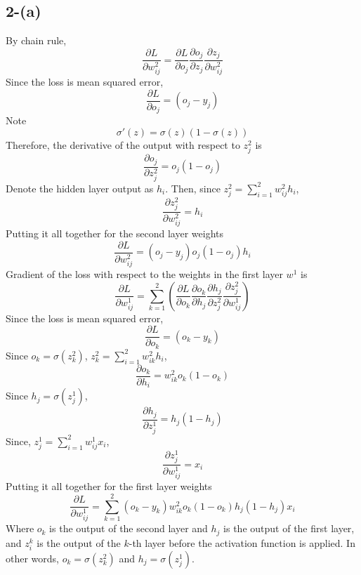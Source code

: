 \documentclass{article}
\begin{document}
\subsection*{2-(a)}
By chain rule,
\[
\frac{\partial L}{\partial w^2_{ij}} = \frac{\partial L}{\partial o_j} \frac{\partial o_j}{\partial z_j} \frac{\partial z_j}{\partial w^2_{ij}}
\]
Since the loss is mean squared error,
\[
\frac{\partial L}{\partial o_j} = (o_j - y_j)
\]
Note
\[
\sigma'(z) = \sigma(z)(1 - \sigma(z))
\]
Therefore, the derivative of the output with respect to $z^2_j$ is
\[
\frac{\partial o_j}{\partial z^2_j} = o_j(1 - o_j)
\]
Denote the hidden layer output as $h_i$. Then, since $z^2_j = \sum_{i=1}^{2} w^2_{ij} h_i$,
\[
\frac{\partial z^2_j}{\partial w^2_{ij}} = h_i
\]
Putting it all together for the second layer weights
\[
\frac{\partial L}{\partial w^2_{ij}} = (o_j - y_j) o_j(1 - o_j) h_i
\]
Gradient of the loss with respect to the weights in the first layer $w^1$ is
\[
\frac{\partial L}{\partial w^1_{ij}} = 
\sum_{k=1}^{2} \left( \frac{\partial L}{\partial o_k} \frac{\partial o_k}{\partial h_j} \frac{\partial h_j}{\partial z^2_j} \frac{\partial z^2_j}{\partial w^1_{ij}} \right)
\]
Since the loss is mean squared error,
\[
\frac{\partial L}{\partial o_k} = (o_k - y_k)
\]
Since $o_k = \sigma(z^2_k)$, $z^2_k = \sum_{i=1}^{2} w^2_{ik} h_i$,
\[
\frac{\partial o_k}{\partial h_i} = w^2_{ik} o_k(1 - o_k)
\]
Since $h_j = \sigma(z^1_j)$,
\[
\frac{\partial h_j}{\partial z^1_j} = h_j(1 - h_j)
\]
Since, $z^1_j = \sum_{i=1}^{2} w^1_{ij} x_i$,
\[
\frac{\partial z^1_j}{\partial w^1_{ij}} = x_i
\]
Putting it all together for the first layer weights
\[
\frac{\partial L}{\partial w^1_{ij}} = \sum_{k=1}^{2} (o_k - y_k) w^2_{ik} o_k(1 - o_k) h_j(1 - h_j) x_i
\]
Where $o_k$ is the output of the second layer and $h_j$ is the output of the first layer,
and $z^k_i$ is the output of the $k$-th layer before the activation function is applied.
In other words, $o_k = \sigma(z^2_k)$ and $h_j = \sigma(z^1_j)$. 
\end{document}

